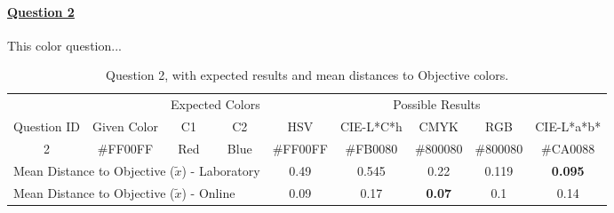 \paragraph{\ul{Question 2}}
%
This color question...
%
\begin{table}[H]
  \resizebox{\textwidth}{!} {
  \begin{tabular}{@{}ccccccccc@{}}
    \toprule
                                  &                                                       & \multicolumn{2}{c}{Expected Colors}                   & \multicolumn{5}{c}{Possible Results}                                                                                                                                                                                                                                                  \\ \cmidrule(l){3-9}
    \multirow{-2}{*}{Question ID} & \multirow{-2}{*}{Given Color}                         & C1                       & C2                         & HSV                                                   & CIE-L*C*h                                             & CMYK                                                  & RGB                                                   & CIE-L*a*b*                                            \\ \midrule
    \multicolumn{1}{c|}{2}        & \multicolumn{1}{c|}{\cellcolor[HTML]{FF00FF}\#FF00FF} & \multicolumn{1}{c|}{Red} & \multicolumn{1}{c|}{Blue} & \multicolumn{1}{c||}{\cellcolor[HTML]{FF00FF}\#FF00FF} & \multicolumn{1}{c||}{\cellcolor[HTML]{FB0080}\#FB0080} & \multicolumn{1}{c||}{\cellcolor[HTML]{800080}\#800080} & \multicolumn{1}{c||}{\cellcolor[HTML]{800080}\#800080} & \multicolumn{1}{c|}{\cellcolor[HTML]{CA0088}\#CA0088} \\ \midrule
    \multicolumn{4}{l}{Mean Distance to Objective ($\tilde{x}$) - Laboratory}                                                                                   & 0.49                                                  & 0.545                                                  & 0.22                                         & 0.119                                                  & \textbf{0.095}                                                  \\
    \multicolumn{4}{l}{Mean Distance to Objective ($\tilde{x}$) - Online}                                                                                   & 0.09                                                  & 0.17                                                  & \textbf{0.07}                                         & 0.1                                                  & 0.14                                                  \\ \bottomrule
    \end{tabular}}
  \caption[Question 2, with expected Results.]{Question 2, with expected results and mean distances to Objective colors.}
  \label{table:lab_q2_expected}
\end{table}
%
%
